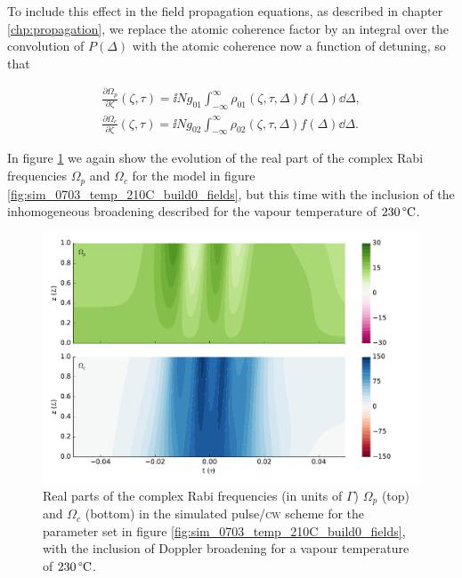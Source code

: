     To include this effect in the field propagation equations, as described in
    chapter \ref{chp:propagation}, we replace the atomic coherence factor by an
    integral over the convolution of $P(\Delta)$ with the atomic coherence now a
    function of detuning, so that

    \begin{subequations}\label{eqn:mwe_svea_doppler}
    \begin{align}
      \frac{\partial \Omega_p}{\partial \zeta}(\zeta, \tau) = \ii N g_{01} 
      \int_{-\infty}^{\infty} \rho_{01}(\zeta, \tau, \Delta) f(\Delta) \dd 
      \Delta, \\
      \frac{\partial \Omega_c}{\partial \zeta}(\zeta, \tau) = \ii N g_{02} 
      \int_{-\infty}^{\infty} \rho_{02}(\zeta, \tau, \Delta) f(\Delta) \dd
      \Delta.
    \end{align}
    \end{subequations}

    In figure \ref{fig:sim_0703_temp_210C_build0b_fields} we again show the
    evolution of the real part of the complex Rabi frequencies $\Omega_p$ and
    $\Omega_c$ for the model in figure
    \ref{fig:sim_0703_temp_210C_build0_fields}, but this time with the
    inclusion of the inhomogeneous broadening described for the vapour
    temperature of $\unit[230]{\textrm{\textdegree C}}$.

    \begin{figure}[h]
      \includegraphics[width=\linewidth]{figs/06_simultons/mb_vee2g_build0b_15c_130p_0330t_230C_sb50_120vel000_00_002um_fig2.pdf}
      \caption{
      Real parts of the complex Rabi frequencies (in units of $\Gamma$)
      $\Omega_{p}$ (top) and  $\Omega_{c}$ (bottom) in the simulated
      pulse/\textsc{cw} scheme for the parameter set in figure
      \ref{fig:sim_0703_temp_210C_build0_fields}, with the inclusion of Doppler
      broadening for a vapour temperature of $\unit[230]{\textrm{\textdegree
      C}}$.
      }
      \label{fig:sim_0703_temp_210C_build0b_fields}
    \end{figure}

